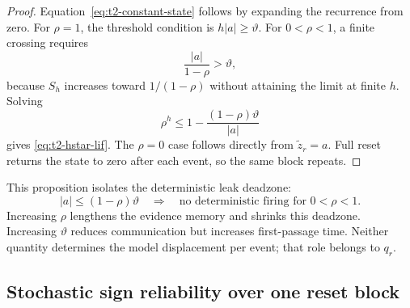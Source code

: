 \begin{proof}
Equation~\eqref{eq:t2-constant-state} follows by expanding the recurrence from zero. For $\rho=1$, the threshold condition is $h|a|\geq\vartheta$. For $0<\rho<1$, a finite crossing requires
\begin{equation}
    \frac{|a|}{1-\rho}>\vartheta,
\end{equation}
because $S_h$ increases toward $1/(1-\rho)$ without attaining the limit at finite $h$. Solving
\begin{equation}
    \rho^h
    \leq
    1-\frac{(1-\rho)\vartheta}{|a|}
\end{equation}
gives \eqref{eq:t2-hstar-lif}. The $\rho=0$ case follows directly from $\widetilde z_r=a$. Full reset returns the state to zero after each event, so the same block repeats.
\end{proof}

This proposition isolates the deterministic leak deadzone:
\begin{equation}
    |a|\leq(1-\rho)\vartheta
    \quad\Longrightarrow\quad
    \text{no deterministic firing for }0<\rho<1.
    \label{eq:t2-leak-deadzone}
\end{equation}
Increasing $\rho$ lengthens the evidence memory and shrinks this deadzone. Increasing $\vartheta$ reduces communication but increases first-passage time. Neither quantity determines the model displacement per event; that role belongs to $q_r$.

\subsection{Stochastic sign reliability over one reset block}

